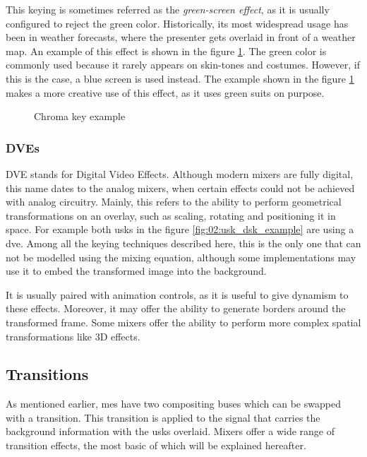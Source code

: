 \documentclass[../main.tex]{subfiles}
\begin{document}
This keying is sometimes referred as the \textit{green-screen effect}, as it is usually configured to reject the green color\cite{OrtizRodriguez2018}. Historically, its most widespread usage has been in weather forecasts, where the presenter gets overlaid in front of a weather map. An example of this effect is shown in the figure \ref{fig:02:chroma_key_example}. The green color is commonly used because it rarely appears on skin-tones and costumes. However, if this is the case, a blue screen is used instead. The example shown in the figure \ref{fig:02:chroma_key_example} makes a more creative use of this effect, as it uses green suits on purpose.\newline

\begin{figure}[htbp]
    \centering

    \caption{Chroma key example}
    \label{fig:02:chroma_key_example}
\end{figure}

\subsubsection{DVEs}
DVE stands for Digital Video Effects. Although modern mixers are fully digital, this name dates to the analog mixers, when certain effects could not be achieved with analog circuitry. Mainly, this refers to the ability to perform geometrical transformations on an overlay, such as scaling, rotating and positioning it in space. For example both \glspl{usk} in the figure \ref{fig:02:usk_dsk_example} are using a \gls{dve}. Among all the keying techniques described here, this is the only one that can not be modelled using the mixing equation, although some implementations may use it to embed the transformed image into the background\cite{OrtizRodriguez2018}.\newline

It is usually paired with animation controls, as it is useful to give dynamism to these effects. Moreover, it may offer the ability to generate borders around the transformed frame\cite{atemManual}. Some mixers offer the ability to perform more complex spatial transformations like 3D effects\cite{xvsManual}.\newline

\subsection{Transitions}
As mentioned earlier, \glspl{me} have two compositing buses which can be swapped with a transition. This transition is applied to the signal that carries the background information with the \glspl{usk} overlaid. Mixers offer a wide range of transition effects, the most basic of which will be explained hereafter.\newline
\end{document}
